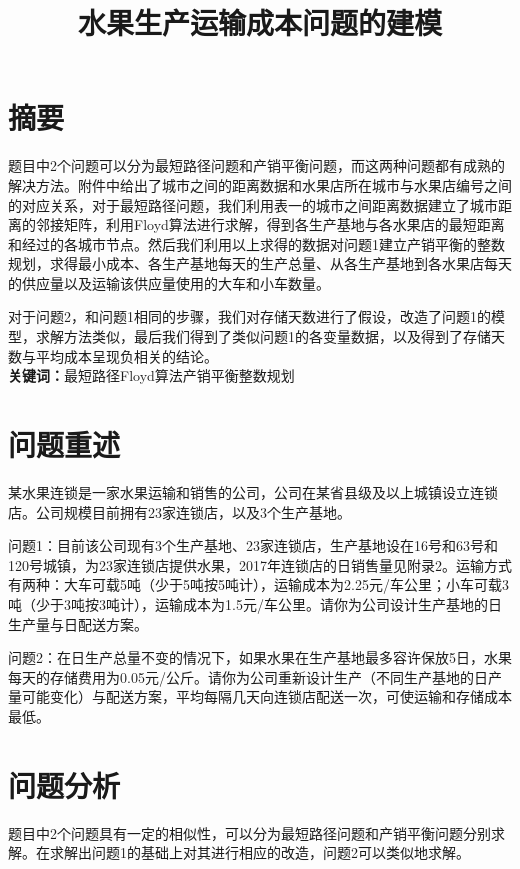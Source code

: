 \documentclass{article}
\title{\LARGE 水果生产运输成本问题的建模}
\begin{document}
	\maketitle
	\tableofcontents
	\thispagestyle{empty}
	\newpage
	\setcounter{page}{1}
	\large


	
	\section{摘要}
	\label{par:zhai_yao_}
	\par 题目中2个问题可以分为最短路径问题和产销平衡问题，而这两种问题都有成熟的解决方法。附件中给出了城市之间的距离数据和水果店所在城市与水果店编号之间的对应关系，对于最短路径问题，我们利用表一的城市之间距离数据建立了城市距离的邻接矩阵，利用Floyd算法进行求解，得到各生产基地与各水果店的最短距离和经过的各城市节点。然后我们利用以上求得的数据对问题1建立产销平衡的整数规划，求得最小成本、各生产基地每天的生产总量、从各生产基地到各水果店每天的供应量以及运输该供应量使用的大车和小车数量。
	
	对于问题2，和问题1相同的步骤，我们对存储天数进行了假设，改造了问题1的模型，求解方法类似，最后我们得到了类似问题1的各变量数据，以及得到了存储天数与平均成本呈现负相关的结论。\\
	\textbf{关键词：}最短路径\quad Floyd算法\quad 产销平衡\quad 整数规划
	\section{问题重述}
	某水果连锁是一家水果运输和销售的公司，公司在某省县级及以上城镇设立连锁店。公司规模目前拥有23家连锁店，以及3个生产基地。
	 
	问题1：目前该公司现有3个生产基地、23家连锁店，生产基地设在16号和63号和120号城镇，为23家连锁店提供水果，2017年连锁店的日销售量见附录2。运输方式有两种：大车可载5吨（少于5吨按5吨计），运输成本为2.25元/车公里；小车可载3吨（少于3吨按3吨计），运输成本为1.5元/车公里。请你为公司设计生产基地的日生产量与日配送方案。
	
	问题2：在日生产总量不变的情况下，如果水果在生产基地最多容许保放5日，水果每天的存储费用为0.05元/公斤。请你为公司重新设计生产（不同生产基地的日产量可能变化）与配送方案，平均每隔几天向连锁店配送一次，可使运输和存储成本最低。
	
	\section{问题分析}
	题目中2个问题具有一定的相似性，可以分为最短路径问题和产销平衡问题分别求解。在求解出问题1的基础上对其进行相应的改造，问题2可以类似地求解。
	
\end{document}

